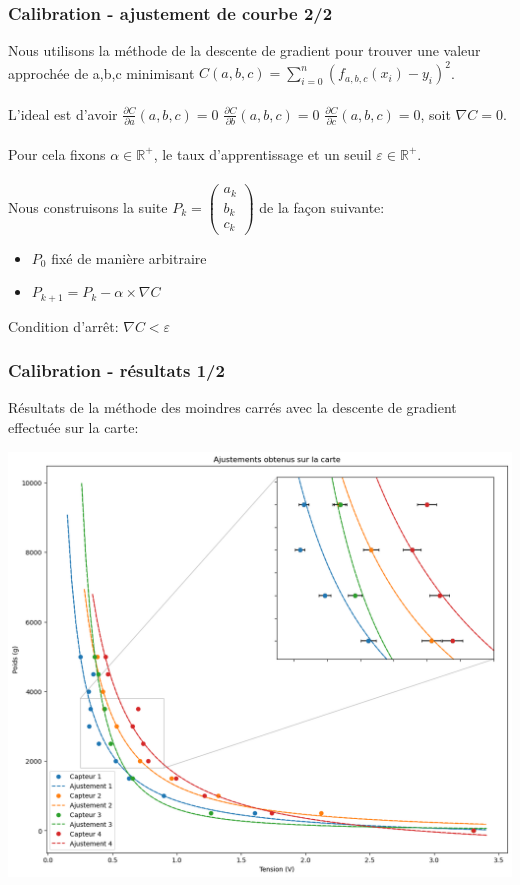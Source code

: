 \begin{frame}
    \frametitle{Calibration - ajustement de courbe 2/2}
    Nous utilisons la méthode de la descente de gradient pour trouver une valeur approchée de a,b,c minimisant $C(a,b,c)=\sum_{i=0}^{n} (f_{a,b,c}(x_i)-y_i)^2$.
    \\
    \\
    L'ideal est d'avoir $\frac{\partial C}{\partial a} (a,b,c) = 0$ $\frac{\partial C}{\partial b} (a,b,c) = 0$ $\frac{\partial C}{\partial c} (a,b,c) = 0$, soit $\nabla C = 0$.
    \\
    \\
    Pour cela fixons $\alpha \in \mathbb{R}^+$, le taux d'apprentissage et un seuil $\varepsilon \in \mathbb{R}^+$.
    \\
    \\
    Nous construisons la suite $P_k=\begin{pmatrix} a_k \\ b_k \\ c_k \end{pmatrix}$ de la façon suivante:
    \begin{itemize}
        \item $P_0$ fixé de manière arbitraire
        \item $P_{k+1}= P_{k} - \alpha \times \nabla C$
    \end{itemize}
    Condition d'arrêt: $\nabla C < \varepsilon$
\end{frame}

\begin{frame}
    \frametitle{Calibration - résultats 1/2}
    Résultats de la méthode des moindres carrés avec la descente de gradient effectuée sur la carte:
    \begin{center}
        \includegraphics[scale=0.3]{./figures/cal_04.png}
    \end{center}
\end{frame}

